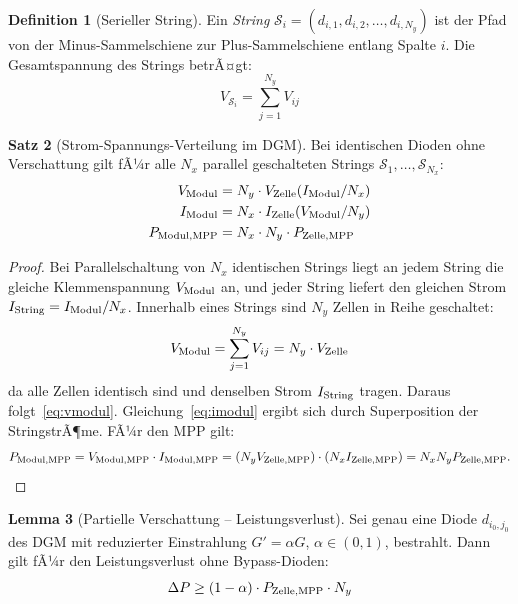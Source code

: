 ﻿\documentclass[a4paper,12pt]{article}
\theoremstyle{definition}
\newtheorem{definition}{Definition}[section]
\newtheorem{lemma}[definition]{Lemma}
\newtheorem{satz}[definition]{Satz}
\theoremstyle{remark}
\begin{document}
\begin{definition}[Serieller String]
Ein \emph{String} $\mathcal{S}_i = (d_{i,1}, d_{i,2}, \ldots, d_{i,N_y})$
ist der Pfad von der Minus-Sammelschiene zur Plus-Sammelschiene entlang
Spalte $i$. Die Gesamtspannung des Strings betrÃ¤gt:
\begin{equation}
  V_{\mathcal{S}_i} = \sum_{j=1}^{N_y} V_{ij}
  \label{eq:vstring}
\end{equation}
\end{definition}

\begin{satz}[Strom-Spannungs-Verteilung im DGM]
\label{satz:netzwerk}
Bei identischen Dioden ohne Verschattung gilt fÃ¼r alle $N_x$ parallel
geschalteten Strings $\mathcal{S}_1, \ldots, \mathcal{S}_{N_x}$:
\begin{align}
  V_{\rm Modul} &= N_y \cdot V_{\rm Zelle}(I_{\rm Modul}/N_x) \label{eq:vmodul}\\
  I_{\rm Modul} &= N_x \cdot I_{\rm Zelle}(V_{\rm Modul}/N_y)  \label{eq:imodul}\\
  P_{\rm Modul,MPP} &= N_x \cdot N_y \cdot P_{\rm Zelle,MPP}    \label{eq:pmodul}
\end{align}
\end{satz}

\begin{proof}
Bei Parallelschaltung von $N_x$ identischen Strings liegt an jedem String
die gleiche Klemmenspannung $V_{\rm Modul}$ an, und jeder String liefert
den gleichen Strom $I_{\rm String} = I_{\rm Modul}/N_x$. Innerhalb eines
Strings sind $N_y$ Zellen in Reihe geschaltet:
\begin{equation*}
  V_{\rm Modul} = \sum_{j=1}^{N_y} V_{ij}
  = N_y \cdot V_{\rm Zelle}
\end{equation*}
da alle Zellen identisch sind und denselben Strom $I_{\rm String}$ tragen.
Daraus folgt~\eqref{eq:vmodul}. Gleichung~\eqref{eq:imodul} ergibt sich durch
Superposition der StringstrÃ¶me. FÃ¼r den MPP gilt:
\begin{equation*}
  P_{\rm Modul,MPP} = V_{\rm Modul,MPP} \cdot I_{\rm Modul,MPP}
    = (N_y V_{\rm Zelle,MPP}) \cdot (N_x I_{\rm Zelle,MPP})
    = N_x N_y P_{\rm Zelle,MPP}. \qedhere
\end{equation*}
\end{proof}

\begin{lemma}[Partielle Verschattung -- Leistungsverlust]
\label{lem:verschattung}
Sei genau eine Diode $d_{i_0, j_0}$ des DGM mit reduzierter Einstrahlung
$G' = \alpha G$, $\alpha \in (0,1)$, bestrahlt. Dann gilt fÃ¼r den
Leistungsverlust ohne Bypass-Dioden:
\begin{equation}
  \Delta P \geq (1 - \alpha) \cdot P_{\rm Zelle,MPP} \cdot N_y
  \label{eq:pverlust}
\end{equation}
\end{lemma}
\end{document}
